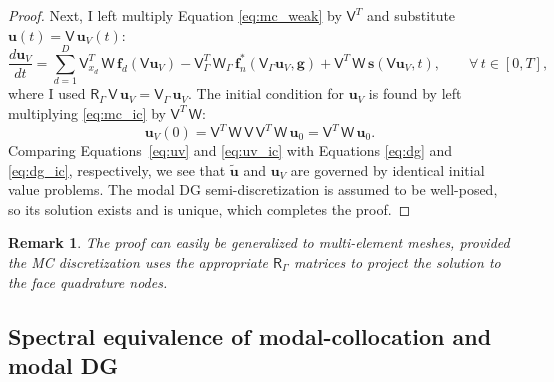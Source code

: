 \documentclass[pdflatex,sn-mathphys-num]{sn-jnl}%
\theoremstyle{thmstyleone}%
\theoremstyle{thmstyletwo}%
\newtheorem{remark}{Remark}%
\theoremstyle{thmstylethree}%
\newcommand{\mat}[1]{\ensuremath{\mathsf{#1}}}
\newcommand{\fnc}[1]{\ensuremath{\mathcal{#1}}}
\begin{document}
\begin{proof}
Next, I left multiply Equation \eqref{eq:mc_weak} by $\mat{V}^{T}$ and substitute $\bm{u}(t) = \mat{V} \, \bm{u}_{V}(t)$:
\begin{equation}\label{eq:uv}
\frac{d \bm{u}_V}{dt} = \sum_{d=1}^D \mat{V}_{x_d}^T \, \mat{W} \, \bm{f}_{d}(\mat{V} \bm{u}_{V}) - \mat{V}_\Gamma^T\, \mat{W}_\Gamma \, \bm{f}_n^*(\mat{V}_\Gamma \bm{u}_{V}, \bm{g}) + \mat{V}^T \, \mat{W}\, \bm{s}(\mat{V} \bm{u}_{V}, t),\qquad \forall\, t \in [0,T],
\end{equation}
where I used $\mat{R}_\Gamma\, \mat{V}\,\bm{u}_{V} = \mat{V}_\Gamma \, \bm{u}_V$.  The initial condition for $\bm{u}_V$ is found by left multiplying \eqref{eq:mc_ic} by $\mat{V}^T \, \mat{W}$:
\begin{equation}\label{eq:uv_ic}
    \bm{u}_V(0) = \mat{V}^T\, \mat{W} \, \mat{V} \, \mat{V}^T \, \mat{W} \, \bm{u}_0 = \mat{V}^T \, \mat{W} \, \bm{u}_0.
\end{equation}
Comparing Equations~\eqref{eq:uv} and \eqref{eq:uv_ic} with Equations \eqref{eq:dg} and \eqref{eq:dg_ic}, respectively, we see that $\tilde{\bm{u}}$ and $\bm{u}_V$ are governed by identical initial value problems.  The modal DG semi-discretization is assumed to be well-posed, so its solution exists and is unique, which completes the proof.
\end{proof}



\begin{remark}
The proof can easily be generalized to multi-element meshes, provided the MC discretization uses the appropriate $\mat{R}_\Gamma$ matrices to project the solution to the face quadrature nodes.
\end{remark}

\subsection{Spectral equivalence of modal-collocation and modal DG}
\end{document}
